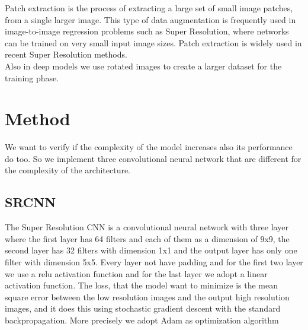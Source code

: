 \documentclass[10pt,twocolumn,letterpaper]{article}
\begin{document}
Patch extraction is the process of extracting a large set of small image patches,  from a single larger image. This type of data augmentation is frequently used in image-to-image regression problems such as Super Resolution, where networks can be trained on very small input image sizes.
Patch extraction is widely used  in recent Super Resolution methods.\\
Also in deep models we use rotated images to create a larger dataset for the training phase.\\


\section{Method}
We want to verify if the complexity of the model increases also its performance do too. So we implement three convolutional neural network that are different for the complexity of the architecture.
\subsection{SRCNN}
The Super Resolution CNN \cite{dong2014image} is a convolutional neural network with three layer where the first layer has 64 filters and each of them as a dimension of 9x9, the second layer has 32 filters with dimension 1x1 and the output layer has only one filter with dimension 5x5. Every layer not have padding and for the first two layer we use a relu activation function and for the last layer we adopt a linear activation function. The loss, that the model want to minimize is the mean square error between the low resolution images and the output high resolution images, and it does this using stochastic gradient descent with the standard backpropagation. More precisely we adopt Adam as optimization algorithm 
\end{document}
